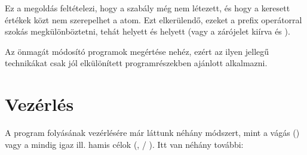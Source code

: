 Ez a megoldás feltételezi, hogy a 
szabály még nem létezett, és hogy a keresett értékek
közt nem szerepelhet a  atom. Ezt
elkerülendő, ezeket a \pr{\$} prefix operátorral
szokás megkülönböztetni, tehát 
helyett  és  helyett
 (vagy a zárójelet kiírva
 és ).

Az önmagát módosító programok megértése nehéz, ezért
az ilyen jellegű technikákat csak jól elkülönített
programrészekben ajánlott alkalmazni.

\section{Vezérlés}
A program folyásának vezérlésére már láttunk néhány
módszert, mint a vágás (\pr{!}) vagy a mindig igaz
ill. hamis célok (,  /
). Itt van néhány további:
